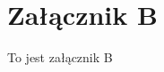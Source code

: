 \documentclass[document.tex]{subfiles}
\begin{document}
\chapter{Załącznik B}
To jest załącznik B
\end{document}
